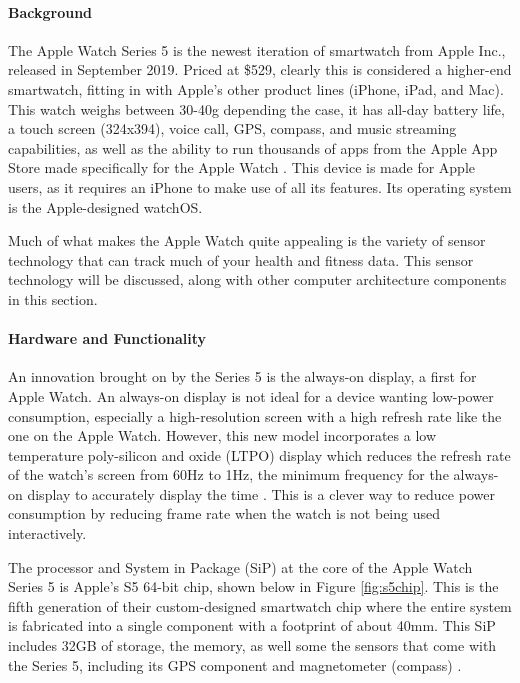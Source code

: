 \paragraph{Background}
The Apple Watch Series 5 is the newest iteration of smartwatch from Apple Inc., released in September
2019. Priced at \$529, clearly this is considered a higher-end smartwatch, fitting in with Apple's
other product lines (iPhone, iPad, and Mac). This watch weighs between 30-40g depending the case, it
has all-day battery life, a touch screen (324x394), voice call, GPS, compass, and music streaming capabilities,
as well as the ability to run thousands of apps from the Apple App Store made specifically 
for the Apple Watch \cite{apple_specs}. This device is made for Apple users, as it requires 
an iPhone to make use of all its features. Its operating system is the Apple-designed watchOS.

Much of what makes the Apple Watch quite appealing is the variety of sensor technology that can track
much of your health and fitness data. This sensor technology will be discussed, along with other
computer architecture components in this section.

\paragraph{Hardware and Functionality}
An innovation brought on by the Series 5 is the always-on display, a first for Apple Watch.
An always-on display is not ideal for a device wanting low-power consumption, especially a high-resolution
screen with a high refresh rate like the one on the Apple Watch. However, this new model incorporates
a low temperature poly-silicon and oxide (LTPO) display which reduces the refresh rate of the watch's
screen from 60Hz to 1Hz, the minimum frequency for the always-on display to accurately 
display the time \cite{apple_specs}. This is a clever way to reduce power consumption by reducing frame
rate when the watch is not being used interactively. 

The processor and System in Package (SiP) at the core of the Apple Watch Series 5 is Apple's S5 64-bit chip,
shown below in Figure \ref{fig:s5chip}. This is the fifth generation of their custom-designed 
smartwatch chip where the entire system is fabricated into a single component with a footprint
of about 40mm. This SiP includes 32GB of storage, the memory, as well some the sensors that come with the 
Series 5, including its GPS component and magnetometer (compass) \cite{apple_specs}.

